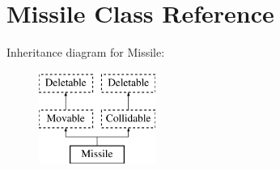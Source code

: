 \hypertarget{class_missile}{\section{Missile Class Reference}
\label{class_missile}
}
Inheritance diagram for Missile\+:\begin{figure}[H]
\begin{center}
\leavevmode
\includegraphics[height=3.000000cm]{class_missile}
\end{center}
\end{figure}

